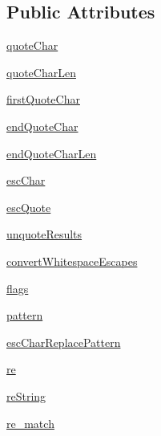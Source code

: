 \subsection*{Public Attributes}
\begin{DoxyCompactItemize}
\item 
\hyperlink{classpip_1_1__vendor_1_1pyparsing_1_1QuotedString_a263d334015c34174910bee106c800922}{quote\+Char}
\item 
\hyperlink{classpip_1_1__vendor_1_1pyparsing_1_1QuotedString_ae4907771312a16caa3c9fc3d25d8f458}{quote\+Char\+Len}
\item 
\hyperlink{classpip_1_1__vendor_1_1pyparsing_1_1QuotedString_adb95c37f986aababba93a395d744dca9}{first\+Quote\+Char}
\item 
\hyperlink{classpip_1_1__vendor_1_1pyparsing_1_1QuotedString_a66cc9eed65116014c79312070229603f}{end\+Quote\+Char}
\item 
\hyperlink{classpip_1_1__vendor_1_1pyparsing_1_1QuotedString_a1e57031a7b3318db3147a2947a657d12}{end\+Quote\+Char\+Len}
\item 
\hyperlink{classpip_1_1__vendor_1_1pyparsing_1_1QuotedString_a9af79cccad754367303fdb70410b63a3}{esc\+Char}
\item 
\hyperlink{classpip_1_1__vendor_1_1pyparsing_1_1QuotedString_a0fd2638dccd75aea7bfe89001a3a9bdb}{esc\+Quote}
\item 
\hyperlink{classpip_1_1__vendor_1_1pyparsing_1_1QuotedString_a454062dbd08fda7582f5f6e162cec42a}{unquote\+Results}
\item 
\hyperlink{classpip_1_1__vendor_1_1pyparsing_1_1QuotedString_ac396605160c4927c39ebc995874039de}{convert\+Whitespace\+Escapes}
\item 
\hyperlink{classpip_1_1__vendor_1_1pyparsing_1_1QuotedString_abce55ce653658d38736cd33bb4af935e}{flags}
\item 
\hyperlink{classpip_1_1__vendor_1_1pyparsing_1_1QuotedString_a16dcc7671edd50526eba8d51920c156d}{pattern}
\item 
\hyperlink{classpip_1_1__vendor_1_1pyparsing_1_1QuotedString_a9012d168a32d5e5c891e30f788c581a8}{esc\+Char\+Replace\+Pattern}
\item 
\hyperlink{classpip_1_1__vendor_1_1pyparsing_1_1QuotedString_a15c93b33a233943cf26b92aeff818144}{re}
\item 
\hyperlink{classpip_1_1__vendor_1_1pyparsing_1_1QuotedString_a29b10dc6ea717ef0256bc0af4a92d99b}{re\+String}
\item 
\hyperlink{classpip_1_1__vendor_1_1pyparsing_1_1QuotedString_aa4cc74db838eca0239cd189f9b870ce7}{re\+\_\+match}

\end{DoxyCompactItemize}
